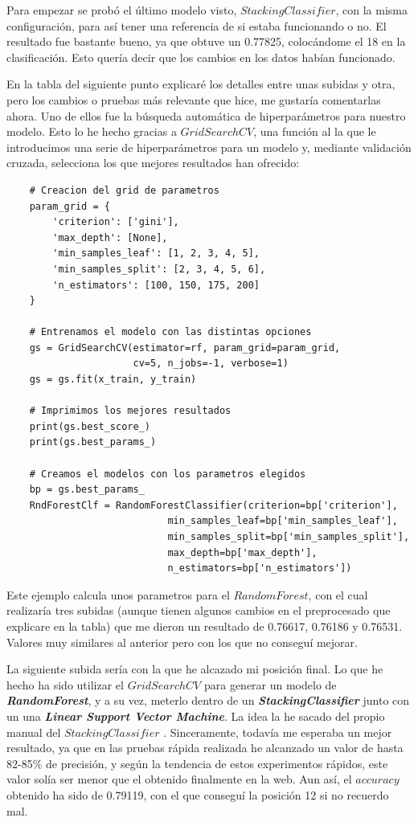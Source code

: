 \documentclass[11pt,a4paper]{article}
\begin{document}
Para empezar se probó el último modelo visto, $StackingClassifier$, con la misma configuración, para así tener una referencia de
si estaba funcionando o no. El resultado fue bastante bueno, ya que obtuve un 0.77825, colocándome el 18 en la clasificación.
Esto quería decir que los cambios en los datos habían funcionado.

\label{grid}
En la tabla del siguiente punto explicaré los detalles entre unas subidas y otra, pero los cambios o pruebas más relevante que
hice, me gustaría comentarlas ahora. Uno de ellos fue la búsqueda automática de hiperparámetros para nuestro modelo. Esto lo he
hecho gracias a $GridSearchCV$, una función al la que le introducimos una serie de hiperparámetros para un modelo y, mediante
validación cruzada, selecciona los que mejores resultados han ofrecido:

\begin{lstlisting}
    # Creacion del grid de parametros
    param_grid = {
        'criterion': ['gini'],
        'max_depth': [None],
        'min_samples_leaf': [1, 2, 3, 4, 5],
        'min_samples_split': [2, 3, 4, 5, 6],
        'n_estimators': [100, 150, 175, 200]
    }

    # Entrenamos el modelo con las distintas opciones
    gs = GridSearchCV(estimator=rf, param_grid=param_grid,
                      cv=5, n_jobs=-1, verbose=1)
    gs = gs.fit(x_train, y_train)

    # Imprimimos los mejores resultados
    print(gs.best_score_)
    print(gs.best_params_)

    # Creamos el modelos con los parametros elegidos
    bp = gs.best_params_
    RndForestClf = RandomForestClassifier(criterion=bp['criterion'],
                            min_samples_leaf=bp['min_samples_leaf'],
                            min_samples_split=bp['min_samples_split'],
                            max_depth=bp['max_depth'],
                            n_estimators=bp['n_estimators'])
\end{lstlisting}

Este ejemplo calcula unos parametros para el $RandomForest$, con el cual realizaría tres subidas (aunque tienen algunos cambios
en el preprocesado que explicare en la tabla) que me dieron un resultado de 0.76617, 0.76186 y 0.76531. Valores muy similares al
anterior pero con los que no conseguí mejorar.

La siguiente subida sería con la que he alcazado mi posición final. Lo que he hecho ha sido utilizar el $GridSearchCV$ para
generar un modelo de \textit{\textbf{RandomForest}}, y a su vez, meterlo dentro de un \textit{\textbf{StackingClassifier}} junto
con un una \textit{\textbf{Linear Support Vector Machine}}. La idea la he sacado del propio manual del $StackingClassifier$
\cite{bib:stacking}. Sinceramente, todavía me esperaba un mejor resultado, ya que en las pruebas rápida realizada he alcanzado
un valor de hasta 82-85\% de precisión, y según la tendencia de estos experimentos rápidos, este valor solía ser menor que el
obtenido finalmente en la web. Aun así, el $accuracy$ obtenido ha sido de 0.79119, con el que conseguí la posición 12 si no
recuerdo mal.
\end{document}
